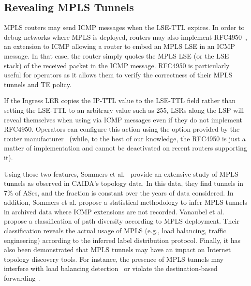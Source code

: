 \subsection{Revealing MPLS Tunnels}\label{related.revealing}
MPLS routers may send ICMP \ttlexceeded messages when the LSE-TTL expires. In
order to debug networks where MPLS is deployed, routers may also implement
RFC4950~\cite{rfc4950}, an extension to ICMP allowing a router to embed an MPLS
LSE in an ICMP \ttlexceeded message. In that case, the router simply quotes the
MPLS LSE (or the LSE stack) of the received packet in the ICMP \ttlexceeded
message. RFC4950 is particularly useful for operators as it allows them to
verify the correctness of their MPLS tunnels and TE policy.

If the Ingress LER copies the IP-TTL value to the LSE-TTL field rather than
setting the LSE-TTL to an arbitrary value such as 255, LSRs along the LSP will
reveal themselves when using \traceroute via ICMP messages even if they do not
implement RFC4950. Operators can configure this action using the \tpropagate
option provided by the router manufacturer~\cite{rfc3443} (while, to the best of
our knowledge, the RFC4950 is just a matter of implementation and cannot be
deactivated on recent routers supporting it). 

Using those two features, Sommers et al.~\cite{SOM11} provide an extensive study
of MPLS tunnels as observed in CAIDA's topology data.  In this data, they find
tunnels in 7\% of ASes, and the fraction is constant over the years of data
considered.  In addition, Sommers et al. propose a statistical methodology to
infer MPLS tunnels in archived data where ICMP extensions are not recorded.
Vanaubel et al.~\cite{Vanaubel15} propose a classification of path diversity
according to MPLS deployment.  Their classification reveals the actual usage of
MPLS (e.g., load balancing, traffic engineering) according to the inferred label
distribution protocol.  Finally, it has also been demonstrated that MPLS tunnels
may have an impact on Internet topology discovery tools.  For instance, the
presence of MPLS tunnels may interfere with load balancing
detection~\cite{BRICE07} or violate the destination-based
forwarding~\cite{Flach2012}.

